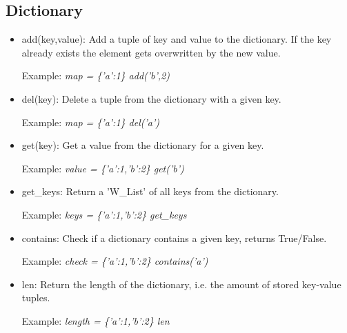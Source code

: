 \documentclass{article}
\begin{document}
\subsection{Dictionary}
\label{builtin_dict}
\begin{itemize}
\item add(key,value): Add a tuple of key and value to the dictionary. If the key already exists the element gets overwritten by the new value.

Example: \textit{map = \{'a':1\} add('b',2)}

\item del(key): Delete a tuple from the dictionary with a given key. 

Example: \textit{map = \{'a':1\} del('a')}

\item get(key): Get a value from the dictionary for a given key.

Example: \textit{value = \{'a':1,'b':2\} get('b')}

\item get\_keys: Return a 'W\_List' of all keys from the dictionary.

Example: \textit{keys = \{'a':1,'b':2\} get\_keys}

\item contains: Check if a dictionary contains a given key, returns True/False.

Example: \textit{check = \{'a':1,'b':2\} contains('a')}

\item len: Return the length of the dictionary, i.e. the amount of stored key-value tuples.

Example: \textit{length = \{'a':1,'b':2\} len}

\end{itemize}
\end{document}
